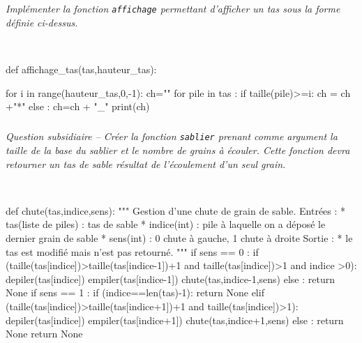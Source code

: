 \documentclass[10pt,fleqn]{article} %
\begin{document}
\subparagraph{}
\textit{Implémenter la fonction \texttt{affichage} permettant d'afficher un tas sous la forme définie ci-dessus.}
\ifprof
\begin{corrige}
~\\
\begin{python}
def affichage_tas(tas,hauteur_tas):

    for i in range(hauteur_tas,0,-1):
        ch=""
        for pile in tas :
            if taille(pile)>=i:
                ch = ch +"*"
            else :
                ch=ch + "_"
        print(ch)
\end{python}
\end{corrige}
\else
\fi

\subparagraph{}
\textit{Question subsidiaire -- Créer la fonction \texttt{sablier} prenant comme argument la taille de la base du sablier et le nombre de grains à écouler. Cette fonction devra retourner un tas de sable résultat de l'écoulement d'un seul grain.}
\ifprof
\begin{corrige}
~\\
\begin{python}
def chute(tas,indice,sens):
    """
    Gestion d'une chute de grain de sable.
    Entrées : 
     * tas(liste de piles) : tas de sable
     * indice(int) : pile à laquelle on a déposé le dernier grain de sable
     * sens(int) : 0 chute à gauche, 1 chute à droite
    Sortie : 
     * le tas est modifié mais n'est pas retourné.
    """
    if sens == 0 :
        if (taille(tas[indice])>taille(tas[indice-1])+1 and taille(tas[indice])>1 and indice >0):
            depiler(tas[indice])
            empiler(tas[indice-1])
            chute(tas,indice-1,sens)
        else :
            return None
    if sens == 1 :
        if (indice==len(tas)-1):
            return None
        elif (taille(tas[indice])>taille(tas[indice+1])+1 and taille(tas[indice])>1):
            depiler(tas[indice])
            empiler(tas[indice+1])
            chute(tas,indice+1,sens)
        else :
            return None
    return None
\end{python}
\end{corrige}
\else
\fi

%
\end{document}
